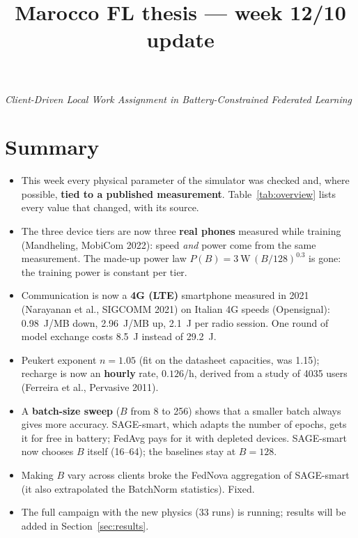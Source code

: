 \documentclass[11pt,a4paper]{article}
\title{\bfseries Marocco FL thesis --- week 12/10 update}
\author{}
\date{}
\begin{document}
\maketitle
\vspace{-3.2em}
\begin{center}
\emph{Client-Driven Local Work Assignment in Battery-Constrained Federated Learning}
\end{center}
\vspace{1em}

\section*{Summary}

\begin{itemize}
  \item This week every physical parameter of the simulator was checked and,
        where possible, \textbf{tied to a published measurement}. Table~\ref{tab:overview}
        lists every value that changed, with its source.
  \item The three device tiers are now three \textbf{real phones} measured
        while training (Mandheling, MobiCom 2022): speed \emph{and} power come
        from the same measurement. The made-up power law
        $P(B)=\SI{3}{\watt}\,(B/128)^{0.3}$ is gone: the training power is
        constant per tier.
  \item Communication is now a \textbf{4G (LTE)} smartphone measured in 2021
        (Narayanan et al., SIGCOMM 2021) on Italian 4G speeds (Opensignal):
        0.98~J/MB down, 2.96~J/MB up, \SI{2.1}{\joule} per radio
        session. One round of model exchange costs \SI{8.5}{\joule} instead of
        \SI{29.2}{\joule}.
  \item Peukert exponent $n=1.05$ (fit on the datasheet capacities, was 1.15);
        recharge is now an \textbf{hourly} rate, $0.126$/h, derived from a
        study of 4035 users (Ferreira et al., Pervasive 2011).
  \item A \textbf{batch-size sweep} ($B$ from 8 to 256) shows that a smaller
        batch always gives more accuracy. SAGE-smart, which adapts the number
        of epochs, gets it for free in battery; FedAvg pays for it with
        depleted devices. SAGE-smart now chooses $B$ itself (16--64); the
        baselines stay at $B=128$.
  \item Making $B$ vary across clients broke the FedNova aggregation of
        SAGE-smart (it also extrapolated the BatchNorm statistics). Fixed.
  \item The full campaign with the new physics (33 runs) is running;
        results will be added in Section~\ref{sec:results}.
\end{itemize}
\end{document}

